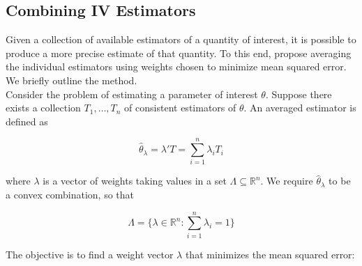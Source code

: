 \documentclass[11pt]{article}
\numberwithin{equation}{section}
\theoremstyle{remark}
\begin{document}
\begin{table}[H]
    \caption{\label{Tab: TNV2} National life table of Dominican Republic II, 2015-2020}
    \centering
    \hspace*{-1cm}
\end{table}


\newpage

\subsection{Combining IV Estimators} \label{S: Comb}

Given a collection of available estimators of a quantity of interest, it is possible to produce a more precise estimate of that quantity. To this end, \citet{Lavancier2016} propose averaging the individual estimators using weights chosen to minimize mean squared error. We briefly outline the method.\\

Consider the problem of estimating a parameter of interest $\theta$. Suppose there exists a collection $T_1,\ldots,T_n$ of consistent estimators of $\theta$. An averaged estimator is defined as

$$\hat{\theta}_\lambda=\lambda'T=\sum \limits_{i=1}^n \lambda_iT_i$$

where $\lambda$ is a vector of weights taking values in a set $\Lambda \subseteq \mathbb{R}^n$. We require $\hat{\theta}_\lambda$ to be a convex combination, so that

$$\Lambda=\Big\{ \lambda \in \mathbb{R}^n: \sum_{i=1}^n \lambda_i=1 \Big\}$$

The objective is to find a weight vector $\lambda$ that minimizes the mean squared error:
\end{document}
